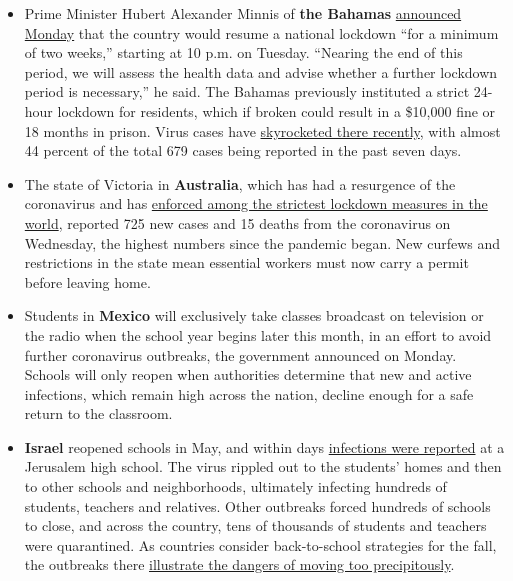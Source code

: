 \begin{itemize}
\item
  Prime Minister Hubert Alexander Minnis of \textbf{the Bahamas}
  \href{https://www.youtube.com/watch?v=ZzwLiboOXe0}{announced Monday}
  that the country would resume a national lockdown ``for a minimum of
  two weeks,'' starting at 10 p.m. on Tuesday. ``Nearing the end of this
  period, we will assess the health data and advise whether a further
  lockdown period is necessary,'' he said. The Bahamas previously
  instituted a strict 24-hour lockdown for residents, which if broken
  could result in a \$10,000 fine or 18 months in prison. Virus cases
  have
  \href{https://www.nytimes3xbfgragh.onion/interactive/2020/world/coronavirus-maps.html}{skyrocketed
  there recently}, with almost 44 percent of the total 679 cases being
  reported in the past seven days.
\item
  The state of Victoria in \textbf{Australia}, which has had a
  resurgence of the coronavirus and has
  \href{https://www.nytimes3xbfgragh.onion/2020/08/04/world/australia/coronavirus-melbourne-lockdown.html}{enforced
  among the strictest lockdown measures in the world}, reported 725 new
  cases and 15 deaths from the coronavirus on Wednesday, the highest
  numbers since the pandemic began. New curfews and restrictions in the
  state mean essential workers must now carry a permit before leaving
  home.
\item
  Students in \textbf{Mexico} will exclusively take classes broadcast on
  television or the radio when the school year begins later this month,
  in an effort to avoid further coronavirus outbreaks, the government
  announced on Monday. Schools will only reopen when authorities
  determine that new and active infections, which remain high across the
  nation, decline enough for a safe return to the classroom.
\item
  \textbf{Israel} reopened schools in May, and within days
  \href{https://www.nytimes3xbfgragh.onion/2020/08/04/world/middleeast/coronavirus-israel-schools-reopen.html}{infections
  were reported} at a Jerusalem high school. The virus rippled out to
  the students' homes and then to other schools and neighborhoods,
  ultimately infecting hundreds of students, teachers and relatives.
  Other outbreaks forced hundreds of schools to close, and across the
  country, tens of thousands of students and teachers were quarantined.
  As countries consider back-to-school strategies for the fall, the
  outbreaks there
  \href{https://www.nytimes3xbfgragh.onion/2020/08/04/world/middleeast/coronavirus-israel-schools-reopen.html}{illustrate
  the dangers of moving too precipitously}.
\end{itemize}

